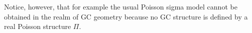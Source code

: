 \documentclass[letterpaper,12pt]{article}
\newcommand{\TT}{{T\oplus T^*}}
\newcommand{\JJ}{\mathcal{J}}
\newcommand{\GG}{\mathcal{G}}
\newcommand{\id}{\mathbbm{1}}
\newcommand{\ap}{\alpha}
\newcommand{\bt}{\beta}
\newcommand{\rd}{\mathrm{d}}
\newcommand{\se}{\Gamma}
\newcommand{\la}{\langle}
\newcommand{\ra}{\rangle}
\newcommand{\lara}{\la\ ,\ \ra}
\theoremstyle{definition}
\theoremstyle{remark}
\theoremstyle{examples}
\DeclareMathOperator{\End}{End}
\begin{document}
Notice, however, that for example the usual Poisson sigma model cannot be obtained in the realm of GC geometry because no GC structure is defined by a real Poisson structure $\Pi$.

%
%
\end{document}
